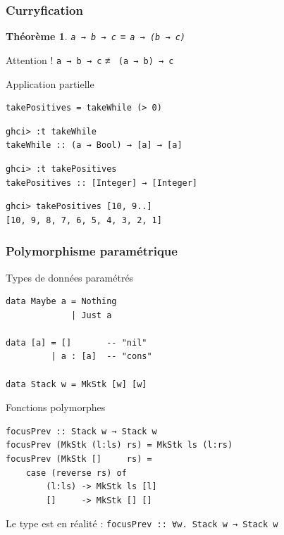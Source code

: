 \documentclass[10pt]{beamer}
\newtheorem{thrm}{Théorème}
\begin{document}
\begin{frame}[fragile]
\frametitle{Curryfication}
\begin{thrm}
\verb|a → b → c| ≡ \verb|a → (b → c)|
\end{thrm}

\pause

\begin{block}
{Attention !}
\verb|a → b → c| ≢ \verb|(a → b) → c|
\end{block}

\pause

\begin{block}
{Application partielle}
\begin{verbatim}
takePositives = takeWhile (> 0)
\end{verbatim}
\pause
\begin{verbatim}
ghci> :t takeWhile
takeWhile :: (a → Bool) → [a] → [a]
\end{verbatim}
\pause
\begin{verbatim}
ghci> :t takePositives
takePositives :: [Integer] → [Integer]
\end{verbatim}
\pause
\begin{verbatim}
ghci> takePositives [10, 9..]
[10, 9, 8, 7, 6, 5, 4, 3, 2, 1]
\end{verbatim}
\end{block}
\end{frame}



\begin{frame}[fragile]
\frametitle{Polymorphisme paramétrique}
\begin{block}
{Types de données paramétrés}
\begin{verbatim}
data Maybe a = Nothing
             | Just a

data [a] = []       -- "nil"
         | a : [a]  -- "cons"

data Stack w = MkStk [w] [w]
\end{verbatim}
\end{block}
\pause
\begin{block}
{Fonctions polymorphes}
\begin{verbatim}
focusPrev :: Stack w → Stack w
focusPrev (MkStk (l:ls) rs) = MkStk ls (l:rs)
focusPrev (MkStk []     rs) =
    case (reverse rs) of
        (l:ls) -> MkStk ls [l]
        []     -> MkStk [] []
\end{verbatim}
\end{block}
Le type est en réalité : \verb|focusPrev :: ∀w. Stack w → Stack w|
\end{frame}
\end{document}
